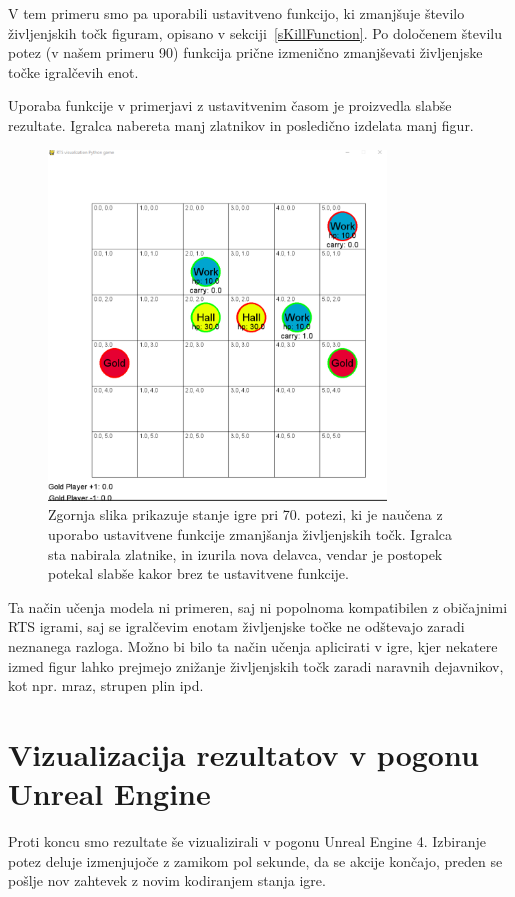 \documentclass[a4paper, 12pt]{book}
\begin{document}
V tem primeru smo pa uporabili ustavitveno funkcijo, ki zmanjšuje število življenjskih točk figuram, opisano v sekciji~\ref{sKillFunction}.
Po določenem številu potez (v našem primeru 90) funkcija prične izmenično zmanjševati življenjske točke igralčevih enot.

Uporaba funkcije v primerjavi z ustavitvenim časom je proizvedla slabše rezultate.
Igralca nabereta manj zlatnikov in posledično izdelata manj figur.



\begin{figure}[h]
	\begin{center}
		\includegraphics[width=0.8\textwidth]{photos/killFunction.pdf}
	\end{center}
	\caption{Zgornja slika prikazuje stanje igre pri 70. potezi, ki je naučena z uporabo ustavitvene funkcije zmanjšanja življenjskih točk. 
		Igralca sta nabirala zlatnike, in izurila nova delavca, vendar je postopek potekal slabše kakor brez te ustavitvene funkcije. }
	\label{vizualizacijaRezultatovKillFunction}
\end{figure}

Ta način učenja modela ni primeren, saj ni popolnoma kompatibilen z običajnimi RTS igrami, saj se igralčevim enotam življenjske točke ne odštevajo zaradi neznanega razloga.
Možno bi bilo ta način učenja aplicirati v igre, kjer nekatere izmed figur lahko prejmejo znižanje življenjskih točk zaradi naravnih dejavnikov, kot npr. mraz, strupen plin ipd.

\section{Vizualizacija rezultatov v pogonu Unreal Engine}
Proti koncu smo rezultate še vizualizirali v pogonu Unreal Engine 4.
Izbiranje potez deluje izmenjujoče z zamikom pol sekunde, da se akcije končajo, preden se pošlje nov zahtevek z novim kodiranjem stanja igre.
\end{document}
